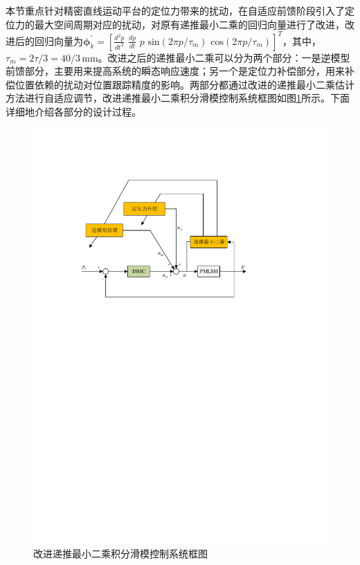 本节重点针对精密直线运动平台的定位力带来的扰动，在自适应前馈阶段引入了定位力的最大空间周期对应的扰动，对原有递推最小二乘的回归向量进行了改进，改进后的回归向量为$\symbf{\phi}_{k}^{'}=\left[\frac{d^{2} p}{d t^{2}} \,\,\frac{d p}{d t} \,\,p \,\,\text{sin}\left(2\pi p/\tau_m\right)\,\,\text{cos}\left(2\pi p/\tau_m\right)\right]^{T}$，其中，$\tau_m=2\tau/3=40/3\,\text{mm}$。改进之后的递推最小二乘可以分为两个部分：一是逆模型前馈部分，主要用来提高系统的瞬态响应速度；另一个是定位力补偿部分，用来补偿位置依赖的扰动对位置跟踪精度的影响。两部分都通过改进的递推最小二乘估计方法进行自适应调节，改进递推最小二乘积分滑模控制系统框图如图\ref{RLSISMC}所示。下面详细地介绍各部分的设计过程。
\begin{figure}[H]
	\centering
	\includegraphics[width=12cm]{figures/RLSISMC系统框图.pdf}
	\caption{改进递推最小二乘积分滑模控制系统框图}
	\label{RLSISMC}
\end{figure}


